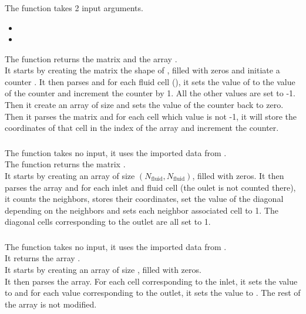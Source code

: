 \subsubsection{\textcolor{func}{}}
The function \textcolor{func}{} takes 2 input arguments.
\begin{itemize}
      \item {}
      \item {} 
\end{itemize}
The function returns the matrix  and the array .\\
It starts by creating the matrix  the shape of , filled with zeros
and initiate a counter . It then parses  and for each fluid
cell (), it sets the value of  to the value of the
counter and increment the counter by 1. All the other values are set to -1.\\
Then it create an array  of size  and
sets the value of the counter back to zero. Then it parses the matrix 
and for each cell which value is not -1, it will store the coordinates of that
cell in the index  of the array  and increment the
counter.

\subsubsection{\textcolor{func}{}}
The function \textcolor{func}{} takes no input, it uses the imported data from
.\\
The function returns the matrix .\\
It starts by creating an array  of size
$(N_{\text{fluid}}, N_{\text{fluid}})$, filled with zeros. It then
parses the array  and for each inlet and fluid cell (the oulet
is not counted there), it counts the neighbors, stores their coordinates,
set the value of the diagonal depending on the neighbors and sets each
neighbor associated cell to 1. The diagonal cells corresponding to the outlet
are all set to 1.

\subsubsection{\textcolor{func}{}}
The function \textcolor{func}{} takes no input, it uses the imported data from
.\\
It returns the array .\\
It starts by creating an array  of size
, filled with zeros.\\
It then parses the array. For each cell corresponding to the inlet, it sets the
value to  and for each value corresponding to the outlet, it sets
the value to . The rest of the array is not modified.

